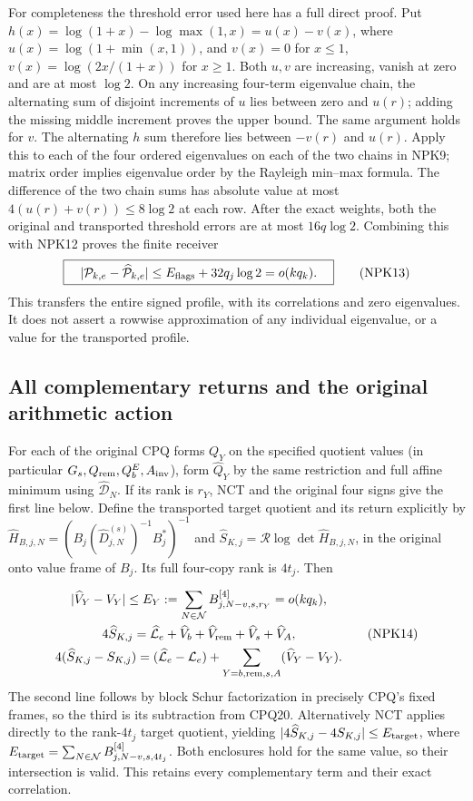 \documentclass[11pt,a4paper]{article}
\begin{document}
For completeness the threshold error used here has a full direct
proof. Put $h(x)=\log(1+x)-\log\max(1,x)=u(x)-v(x)$, where
$u(x)=\log(1+\min(x,1))$, and $v(x)=0$ for $x\le1$,
$v(x)=\log(2x/(1+x))$ for $x\ge1$. Both $u,v$ are increasing,
vanish at zero and are at most $\log2$. On any increasing
four-term eigenvalue chain, the alternating sum of disjoint
increments of $u$ lies between zero and $u(r)$; adding the
missing middle increment proves the upper bound. The same
argument holds for $v$. The alternating $h$ sum therefore
lies between $-v(r)$ and $u(r)$. Apply this to each of the four
ordered eigenvalues on each of the two chains in NPK9; matrix
order implies eigenvalue order by the Rayleigh min--max formula.
The difference of the two chain sums has absolute value at most
$4(u(r)+v(r))\le8\log2$ at each row. After the exact weights,
both the original and transported threshold errors are at most
$16q\log2$. Combining this with NPK12 proves the finite receiver
\[
 \boxed{\quad
 |\mathcal P_{k,e}-\widehat{\mathcal P}_{k,e}|
 \le E_{\rm flags}+32q_j\log2=o(kq_k).
 \quad}\tag{NPK13}
\]
This transfers the entire signed profile, with its correlations
and zero eigenvalues. It does not assert a rowwise approximation
of any individual eigenvalue, or a value for the transported profile.

\subsection{All complementary returns and the original arithmetic action}
\begingroup\raggedright
For each of the original CPQ forms $Q_Y$ on the specified quotient
values (in particular $G_s,Q_{\rm rem},Q_b^E,A_{\rm inv}$), form
$\widehat Q_Y$ by the same restriction and full affine minimum
using $\widehat{\mathcal D}_N$. If its rank is $r_Y$, NCT and
the original four signs give the first line below. Define the
transported target quotient and its return explicitly by
$\widehat H_{B,j,N}=(B_j(\widehat D_{j,N}^{(s)})^{-1}B_j^*)^{-1}$
and $\widehat S_{K,j}=\mathcal R\log\det\widehat H_{B,j,N}$,
in the original onto value frame of $B_j$. Its full four-copy
rank is $4t_j$. Then
\par\endgroup
\[
 \begin{gathered}
 |\widehat V_Y-V_Y|\le
 E_Y:=\sum_{N\in\mathcal N}B^{[4]}_{j,N-v,s,r_Y}=o(kq_k),\\
 4\widehat S_{K,j}=\widehat{\mathcal L}_e+
      \widehat V_b+\widehat V_{\rm rem}+\widehat V_s+\widehat V_A,\\
 4(\widehat S_{K,j}-S_{K,j})=
 (\widehat{\mathcal L}_e-\mathcal L_e)+
 \sum_{Y=b,{\rm rem},s,A}(\widehat V_Y-V_Y).
 \end{gathered}\tag{NPK14}
\]
The second line follows by block Schur factorization in precisely
CPQ's fixed frames, so the third is its subtraction from CPQ20.
Alternatively NCT applies directly to the rank-$4t_j$ target
quotient, yielding
$|4\widehat S_{K,j}-4S_{K,j}|\le E_{\rm target}$, where
$E_{\rm target}=\sum_{N\in\mathcal N}B^{[4]}_{j,N-v,s,4t_j}$.
Both enclosures hold for the same
value, so their intersection is valid. This retains every
complementary term and their exact correlation.
\end{document}
